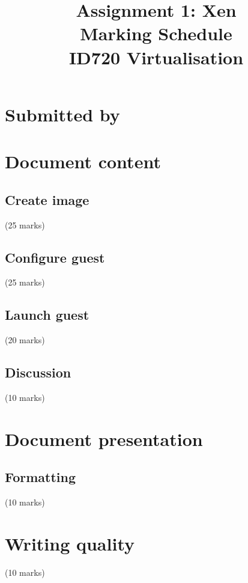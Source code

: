 \documentclass{article}
\begin{document}
\title{Assignment 1: Xen \\ Marking Schedule\\ID720 Virtualisation}
\date{}
\maketitle

\section*{Submitted by}

 \vspace{20mm}
 
\section{Document content}

\subsection{Create image}
 (25 marks)
 
 \vspace{30mm}

\subsection{Configure guest}
 (25 marks)
 
 \vspace{30mm}
 
\subsection{Launch guest}
 (20 marks)
 
 \vspace{30mm}
 
\subsection{Discussion}
 (10 marks)
 
 \vspace{30mm}
 
\section{Document presentation}

\subsection{Formatting}
 (10 marks)
 
 \vspace{20mm}
 
\section{Writing quality}
 (10 marks)
 
\end{document}
